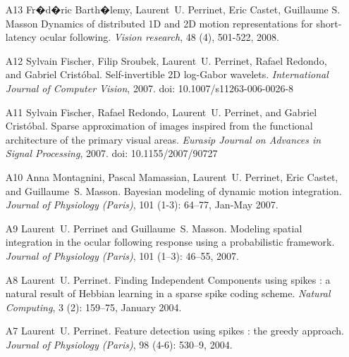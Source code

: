 \documentclass[11pt,french,a4paper,oneside]{article}%
\newcommand{\years}[1]{\marginpar{\textit{\scriptsize #1}}}
\providecommand{\doi}[1]{doi: #1}%
\begin{document}
\begin{enumerate}
\item[A13] Fr�d�ric Barth�lemy, Laurent~U. Perrinet, Eric Castet, Guillaume S. Masson
\newblock Dynamics of distributed 1D and 2D motion representations for short-latency ocular following.
\newblock \emph{Vision research}, 48 (4), 501-522, 2008.


\item[A12] %
Sylvain Fischer, \years{2007} Filip Sroubek, Laurent~U. Perrinet, Rafael Redondo, and
  Gabriel Crist{\'o}bal.
\newblock Self-invertible 2{D} log-{G}abor wavelets.
\newblock \emph{International Journal of Computer Vision}, 2007.
\newblock \doi{10.1007/s11263-006-0026-8}

\item[A11] %
Sylvain Fischer, Rafael Redondo, Laurent~U. Perrinet, and   Gabriel Crist{\'o}bal.
\newblock Sparse approximation of images inspired from the functional architecture of the primary visual areas.
\newblock \emph{Eurasip Journal on Advances in Signal Processing}, 2007.
\newblock \doi{10.1155/2007/90727}

\item[A10] %
Anna Montagnini, Pascal Mamassian, Laurent~U. Perrinet, Eric Castet, and
  Guillaume~S. Masson.
\newblock Bayesian modeling of dynamic motion integration.
\newblock \emph{Journal of {P}hysiology ({P}aris)}, 101
  (1-3): 64--77, Jan-May 2007.

\item[A9] %
Laurent~U. Perrinet and Guillaume~S. Masson.
\newblock Modeling spatial integration in the ocular following response using a
  probabilistic framework.
\newblock \emph{Journal of {P}hysiology ({P}aris)}, 101
  (1--3): 46--55, 2007.


\item[A8] %
Laurent~U. Perrinet. \years{2004}
\newblock Finding {I}ndependent {C}omponents using spikes : a natural result of
  Hebbian learning in a sparse spike coding scheme.
\newblock \emph{Natural {C}omputing}, 3 (2): 159--75, January
  2004.

\item[A7] %
Laurent~U. Perrinet.
\newblock Feature detection using spikes : the greedy approach.
\newblock \emph{Journal of {P}hysiology ({P}aris)}, 98 (4-6):
  530--9, 2004.


\end{enumerate}
\end{document}
